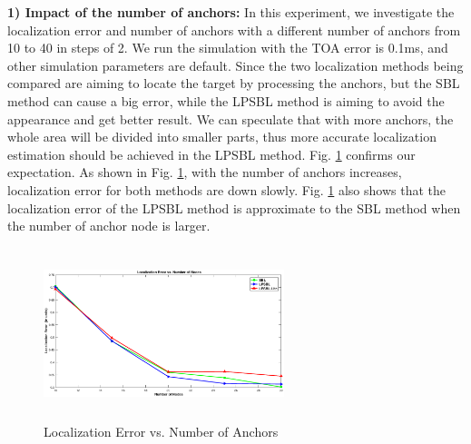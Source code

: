 \textbf{1) Impact of the number of anchors:}
 In this experiment, we investigate the localization error and number of anchors with a different number of anchors from 10 to 40 in steps of 2. 
 We run the simulation with the TOA error is 0.1ms, and other simulation parameters are default. 
 Since the two localization methods being compared are aiming to locate the target by processing the anchors, 
 but the SBL method can cause a big error, while the LPSBL method is aiming to avoid the appearance and get better result. 
 We can speculate that with more anchors, the whole area will be divided into smaller parts, 
 thus more accurate localization estimation should be achieved in the LPSBL method. 
Fig. \ref{fig4} confirms our expectation. As shown in Fig. \ref{fig4}, with the number of anchors increases, localization error for both  methods are down slowly. 
Fig. \ref{fig4} also shows that the localization error of the LPSBL method is approximate to the SBL method when the number of anchor node is larger.
  \begin{figure}[htb]
            \setlength{\abovecaptionskip}{0pt}
            \centering
			 \vspace{-3mm}
           		 \includegraphics[height=5.0cm,width=7.0cm]{image/Nodenumber.eps}
            \caption{Localization Error vs. Number of Anchors}
             \vspace{-5mm}
             \label{fig4}
        \end{figure}	
		
